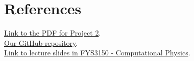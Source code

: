 \documentclass{article}
\begin{document}
\clearpage

\vspace{1cm}

\section{References} \label{sec:References}


\href{https://github.com/CompPhysics/ComputationalPhysics/blob/master/doc/Projects/2019/Project2/pdf/Project2.pdf}{Link to the PDF for Project 2}. \\

\href{https://github.com/Erikbgram/Fys3150}{Our GitHub-repository}. \\

\href{https://github.com/CompPhysics/ComputationalPhysics/blob/master/doc/Lectures/lectures2015.pdf}{Link to lecture slides in FYS3150 - Computational Physics}.









\end{document}
